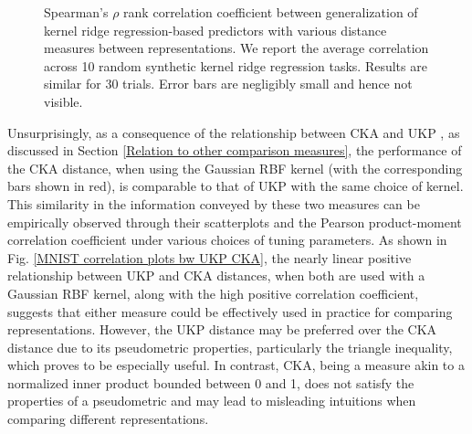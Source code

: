 \documentclass[11pt]{article}
\newcommand{\metricstname}{UKP }
\theoremstyle{plain}
\begin{document}
\begin{figure}[!h]
    \caption{Spearman's $\rho$ rank correlation coefficient between generalization of kernel ridge regression-based predictors with various distance measures between representations. We report the average correlation across 10 random synthetic kernel ridge regression tasks. Results are similar for 30 trials. Error bars are negligibly small and hence not visible.}
    \label{MNIST generalization plots}
\end{figure}

Unsurprisingly, as a consequence of the relationship between CKA and \metricstname, as discussed in Section \ref{Relation to other comparison measures}, the performance of the CKA distance, when using the Gaussian RBF kernel (with the corresponding bars shown in red), is comparable to that of \metricstname with the same choice of kernel. This similarity in the information conveyed by these two measures can be empirically observed through their scatterplots and the Pearson product-moment correlation coefficient under various choices of tuning parameters. As shown in Fig. \ref{MNIST correlation plots bw UKP CKA}, the nearly linear positive relationship between \metricstname and CKA distances, when both are used with a Gaussian RBF kernel, along with the high positive correlation coefficient, suggests that either measure could be effectively used in practice for comparing representations. However, the \metricstname distance may be preferred over the CKA distance due to its pseudometric properties, particularly the triangle inequality, which proves to be especially useful. In contrast, CKA, being a measure akin to a normalized inner product bounded between 0 and 1, does not satisfy the properties of a pseudometric and may lead to misleading intuitions when comparing different representations.

\raggedbottom
\end{document}
